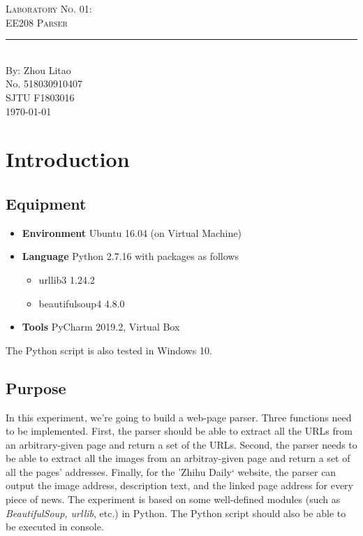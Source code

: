 \documentclass{article}
\newcommand{\labno}{01}
\newcommand{\labtitle}{EE208 Parser}
\newcommand{\authorname}{Zhou Litao}
\newcommand{\studentno}{518030910407}
\newcommand{\classno}{F1803016}
\begin{document}
\begin{center}
{\LARGE \textsc{Laboratory No. \labno:} \\ \vspace{4pt}}
{\Large \textsc{\labtitle} \\ \vspace{4pt}} 
\rule[13pt]{\textwidth}{1pt} \\ \vspace{15pt}
{\large By: \authorname \\ \vspace{10pt}
No. \studentno \\ \vspace{10pt}
SJTU \classno \\ \vspace{10pt}
\today \vspace{20pt}}
\end{center}



\section{Introduction}

\subsection{Equipment}
\begin{itemize}
\item\textbf{Environment} Ubuntu 16.04 (on Virtual Machine)
\item\textbf{Language} Python 2.7.16 with packages as follows
	\begin{itemize}
	\item urllib3 1.24.2
	\item beautifulsoup4 4.8.0
	\end{itemize}
\item\textbf{Tools} PyCharm 2019.2, Virtual Box
\end{itemize}
The Python script is also tested in Windows 10.

\subsection{Purpose}
In this experiment, we're going to build a web-page parser. Three functions need to be implemented. First, the parser should be able to extract all the URLs from an arbitrary-given page and return a set of the URLs. Second, the parser needs to be able to extract all the images from an arbitray-given page and return a set of all the pages' addresses. Finally, for the 'Zhihu Daily` website, the parser can output the image address, description text, and the linked page address for every piece of news. The experiment is based on some well-defined modules (such as \textit{BeautifulSoup, urllib}, etc.) in Python. The Python script should also be able to be executed in console.
\end{document}
